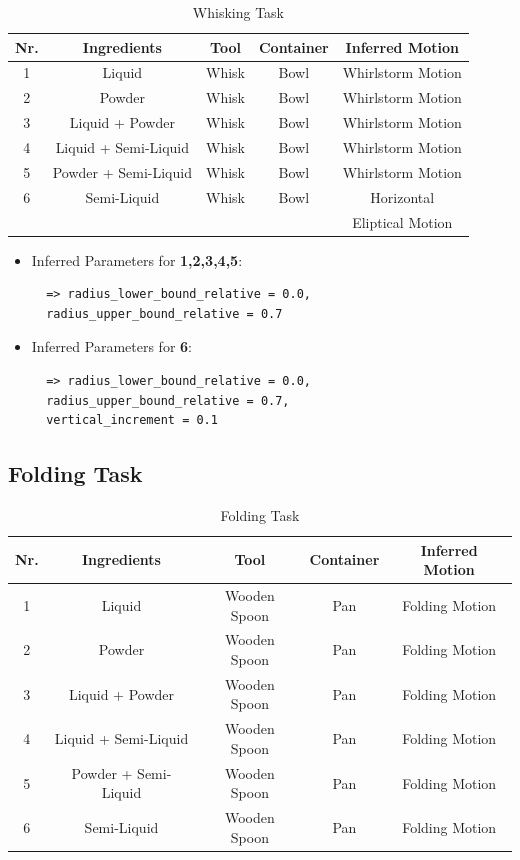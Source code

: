 \begin{table}[H]
  \centering
  \begin{tabular}{|c|c|c|c|c|}
    \hline
    \textbf{Nr.} & \textbf{Ingredients} & \textbf{Tool} & \textbf{Container} & \textbf{Inferred Motion}  \\
    \hline
    1 & Liquid & Whisk & Bowl & Whirlstorm Motion \\
    \hline
    2 & Powder & Whisk & Bowl & Whirlstorm Motion\\
    \hline
    3 & Liquid + Powder & Whisk & Bowl & Whirlstorm Motion \\
    \hline
    4 & Liquid + Semi-Liquid & Whisk & Bowl & Whirlstorm Motion \\
    \hline
    5 & Powder + Semi-Liquid & Whisk & Bowl & Whirlstorm Motion \\
    \hline
    6 & Semi-Liquid & Whisk & Bowl & Horizontal
    \\ & & &  &Eliptical Motion \\
    \hline
  \end{tabular}
  \caption{Whisking Task}
  \label{tab:mixingtask}
\end{table}

\begin{itemize}
\item Inferred Parameters for \textbf{1,2,3,4,5}: 
 \begin{lstlisting}
  => radius_lower_bound_relative = 0.0, 
  radius_upper_bound_relative = 0.7
\end{lstlisting}
\item Inferred Parameters for \textbf{6}:
\begin{lstlisting}
  => radius_lower_bound_relative = 0.0, 
  radius_upper_bound_relative = 0.7,
  vertical_increment = 0.1
\end{lstlisting}
\end{itemize}

\subsection{Folding Task}
\begin{table}[H]
  \centering
  \begin{tabular}{|c|c|c|c|c|}
    \hline
    \textbf{Nr.} & \textbf{Ingredients} & \textbf{Tool} & \textbf{Container} & \textbf{Inferred Motion}  \\
    \hline
    1 & Liquid & Wooden Spoon & Pan & Folding Motion \\
    \hline
    2 & Powder & Wooden Spoon & Pan & Folding Motion \\
    \hline
    3 & Liquid + Powder & Wooden Spoon & Pan & Folding Motion \\
    \hline
    4 & Liquid + Semi-Liquid & Wooden Spoon & Pan & Folding Motion \\
    \hline
    5 & Powder + Semi-Liquid & Wooden Spoon & Pan & Folding Motion \\
    \hline
    6 & Semi-Liquid & Wooden Spoon & Pan & Folding Motion \\
    \hline
  \end{tabular}
  \caption{Folding Task}
  \label{tab:mixingtask}
\end{table}

